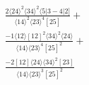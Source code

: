 \documentclass[varwidth, border=5pt]{standalone}
\begin{document}
\begin{my}
$\begin{gathered}
\scriptscriptstyle\frac{2⟨24⟩^2⟨34⟩^2⟨5|3-4|2]}{⟨14⟩^2⟨23⟩^4[25]}+\\
\scriptscriptstyle\frac{-1⟨12⟩[12]^2⟨34⟩^2⟨24⟩}{⟨14⟩⟨23⟩^4[25]^2}+\\
\scriptscriptstyle\frac{-2[12]⟨24⟩⟨34⟩^2[23]}{⟨14⟩⟨23⟩^3[25]^2}\phantom{+}
\end{gathered}$
\end{my}
\end{document}

